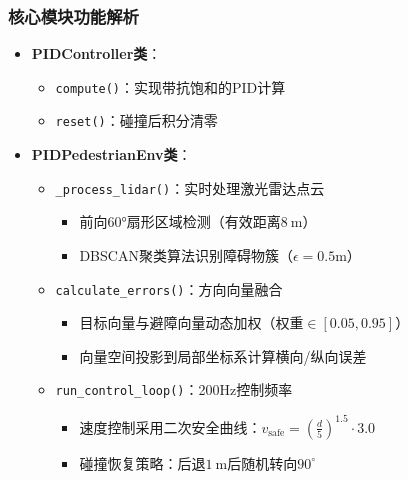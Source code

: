 \subsubsection{核心模块功能解析}
\begin{itemize}
  \item \textbf{PIDController类}：
    \begin{itemize}
      \item \texttt{compute()}：实现带抗饱和的PID计算
      \item \texttt{reset()}：碰撞后积分清零
    \end{itemize}
    
  \item \textbf{PIDPedestrianEnv类}：
    \begin{itemize}
        \item \texttt{\_process\_lidar()}：实时处理激光雷达点云
        \begin{itemize}
            \item 前向60°扇形区域检测（有效距离$8\ \text{m}$）
            \item DBSCAN聚类算法识别障碍物簇（$\epsilon=0.5$m）
        \end{itemize}
        
        \item \texttt{calculate\_errors()}：方向向量融合
        \begin{itemize}
            \item 目标向量与避障向量动态加权（权重$\in[0.05,0.95]$）
            \item 向量空间投影到局部坐标系计算横向/纵向误差
        \end{itemize}
        
        \item \texttt{run\_control\_loop()}：200Hz控制频率
        \begin{itemize}
            \item 速度控制采用二次安全曲线：$v_{\text{safe}} = (\frac{d}{5})^{1.5} \cdot 3.0$
            \item 碰撞恢复策略：后退$1\ \text{m}$后随机转向$90^\circ$
        \end{itemize}
    \end{itemize}
\end{itemize}

